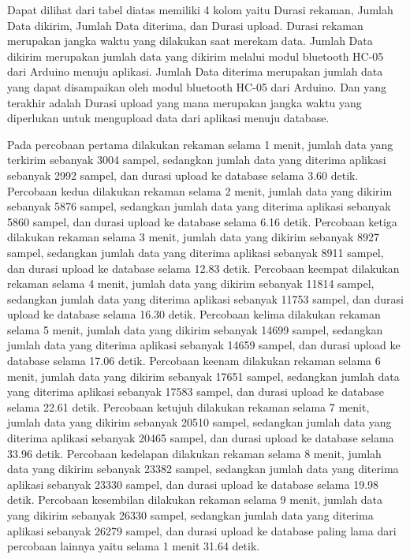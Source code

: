 Dapat dilihat dari tabel diatas memiliki 4 kolom yaitu Durasi rekaman, Jumlah Data dikirim, Jumlah Data diterima, dan Durasi upload. Durasi rekaman merupakan jangka waktu yang dilakukan saat merekam data. Jumlah Data dikirim merupakan jumlah data yang dikirim melalui modul bluetooth HC-05 dari Arduino menuju aplikasi. Jumlah Data diterima merupakan jumlah data yang dapat disampaikan oleh modul bluetooth HC-05 dari Arduino. Dan yang terakhir adalah Durasi upload yang mana merupakan jangka waktu yang diperlukan untuk mengupload data dari aplikasi menuju database.

Pada percobaan pertama dilakukan rekaman selama 1 menit, jumlah data yang terkirim sebanyak 3004 sampel, sedangkan jumlah data yang diterima aplikasi sebanyak 2992 sampel, dan durasi upload ke database selama 3.60 detik. Percobaan kedua dilakukan rekaman selama 2 menit, jumlah data yang dikirim sebanyak 5876 sampel, sedangkan jumlah data yang diterima aplikasi sebanyak 5860 sampel, dan durasi upload ke database selama 6.16 detik. Percobaan ketiga dilakukan rekaman selama 3 menit, jumlah data yang dikirim sebanyak 8927 sampel, sedangkan jumlah data yang diterima aplikasi sebanyak 8911 sampel, dan durasi upload ke database selama 12.83 detik. Percobaan keempat dilakukan rekaman selama 4 menit, jumlah data yang dikirim sebanyak 11814 sampel, sedangkan jumlah data yang diterima aplikasi sebanyak 11753 sampel, dan durasi upload ke database selama 16.30 detik. Percobaan kelima dilakukan rekaman selama 5 menit, jumlah data yang dikirim sebanyak 14699 sampel, sedangkan jumlah data yang diterima aplikasi sebanyak 14659 sampel, dan durasi upload ke database selama 17.06 detik. Percobaan keenam dilakukan rekaman selama 6 menit, jumlah data yang dikirim sebanyak 17651 sampel, sedangkan jumlah data yang diterima aplikasi sebanyak 17583 sampel, dan durasi upload ke database selama 22.61 detik. Percobaan ketujuh dilakukan rekaman selama 7 menit, jumlah data yang dikirim sebanyak 20510 sampel, sedangkan jumlah data yang diterima aplikasi sebanyak 20465 sampel, dan durasi upload ke database selama 33.96 detik. Percobaan kedelapan dilakukan rekaman selama 8 menit, jumlah data yang dikirim sebanyak 23382 sampel, sedangkan jumlah data yang diterima aplikasi sebanyak 23330 sampel, dan durasi upload ke database selama 19.98 detik. Percobaan kesembilan dilakukan rekaman selama 9 menit, jumlah data yang dikirim sebanyak 26330 sampel, sedangkan jumlah data yang diterima aplikasi sebanyak 26279 sampel, dan durasi upload ke database paling lama dari percobaan lainnya yaitu selama 1 menit 31.64 detik.
